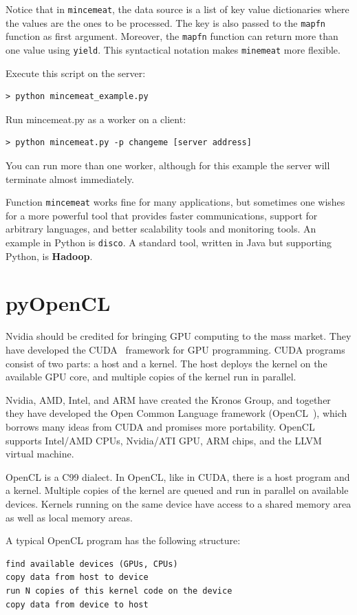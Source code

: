 \documentclass[justified,sixbynine]{tufte-book}
\def\ft{\small\tt}
\theoremstyle{plain}%
\theoremstyle{definition}
\theoremstyle{remark}
\begin{document}
\begin{fullwidth}
Notice that in {\ft mincemeat}, the data source is a list of key value dictionaries where the values are the ones to be processed. The key is also passed to the {\ft mapfn} function as first argument. Moreover, the {\ft mapfn} function can return more than one value using {\ft yield}. This syntactical notation makes {\ft minemeat} more flexible.

Execute this script on the server:
\begin{lstlisting}
> python mincemeat_example.py
\end{lstlisting}
Run mincemeat.py as a worker on a client:
\begin{lstlisting}
> python mincemeat.py -p changeme [server address]
\end{lstlisting}
You can run more than one worker, although for this example the server will terminate almost immediately.

Function {\ft mincemeat} works fine for many applications, but sometimes one wishes for a more powerful tool that provides faster communications, support for arbitrary languages, and better scalability tools and monitoring tools. An example in Python is {\ft disco}. A standard tool, written in Java but supporting Python, is {\bf Hadoop}.

\goodbreak\section{pyOpenCL}

Nvidia should be credited for bringing GPU computing to the mass market. They have developed the CUDA~\cite{cuda} framework for GPU programming. CUDA programs consist of two parts: a host and a kernel. The host deploys the kernel on the available GPU core, and multiple copies of the kernel run in parallel.

Nvidia, AMD, Intel, and ARM have created the Kronos Group, and together they have developed the Open Common Language framework (OpenCL~\cite{opencl}), which borrows many ideas from CUDA and promises more portability. OpenCL supports
Intel/AMD CPUs, Nvidia/ATI GPU, ARM chips, and the LLVM virtual machine.

OpenCL is a C99 dialect. In OpenCL, like in CUDA, there is a host program and a kernel. Multiple copies of the kernel are queued and run in parallel on available devices. Kernels running on the same device have access to a shared memory area as well as local memory areas.

A typical OpenCL program has the following structure:
\begin{lstlisting}
find available devices (GPUs, CPUs)
copy data from host to device
run N copies of this kernel code on the device
copy data from device to host
\end{lstlisting}


\end{fullwidth}
\end{document}
